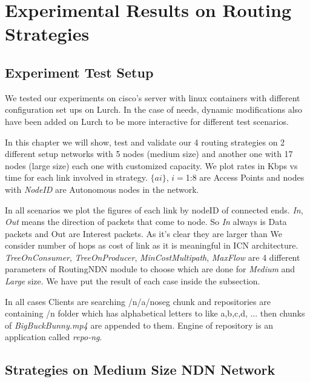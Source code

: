 
\chapter{Experimental Results on Routing Strategies} %

\label{expereince}


\section{Experiment Test Setup}
We tested our experiments on cisco's server with linux containers with different configuration set ups on Lurch. In the case of needs, dynamic modifications also have been added on Lurch to be more interactive for different test scenarios.

In this chapter we will show, test and validate our 4 routing strategies on 2 different setup networks with 5 nodes (medium size) and another one with 17 nodes (large size) each one with customized capacity. We plot rates in Kbps vs time for each link involved in strategy. $\{ai\}$, $i=$1:8 are Access Points and nodes with \textit{NodeID} are Autonomous nodes in the network.
   
In all scenarios we plot the figures of each link by nodeID of connected ends. \textit{In}, \textit{Out} means the direction of packets that come to node. So \textit{In} always is Data packets and Out are Interest packets. As it's clear they are larger than We consider number of hops as cost of link as it is meaningful in ICN architecture.
\textit{TreeOnConsumer}, \textit{TreeOnProducer}, \textit{MinCostMultipath}, \textit{MaxFlow} are 4 different parameters of RoutingNDN module to choose which are done for \textit{Medium} and \textit{Large} size. We have put the result of each case inside the subsection.

In all cases Clients are searching /n/a/noseg chunk and repositories are containing /n folder which has alphabetical letters to like a,b,c,d, ... then chunks of \textit{BigBuckBunny.mp4} are appended to them. Engine of repository is an application called \textit{repo-ng}. 

\section{Strategies on Medium Size NDN Network}


